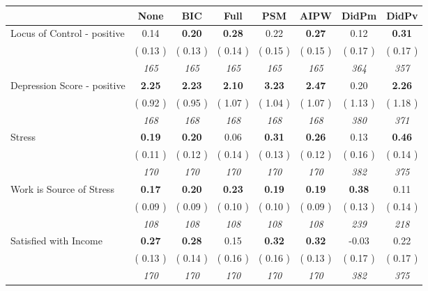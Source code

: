 \begin{tabular}{l c c c c c c c}
\toprule
 & None & BIC & Full & PSM & AIPW & DidPm & DidPv \\
\midrule
Locus of Control - positive &      0.14 & \textbf{      0.20 } & \textbf{      0.28 } &      0.22 & \textbf{     0.27} &      0.12 & \textbf{      0.31 } \\
& (     0.13 ) & (     0.13 ) & (     0.14 ) & (     0.15 ) & (     0.15 ) & (     0.17 ) & (     0.17 ) \\
& \textit{ 165 } & \textit{ 165 } & \textit{ 165 } & \textit{ 165 } & \textit{ 165 } & \textit{ 364 } & \textit{ 357 } \\
Depression Score - positive & \textbf{      2.25 } & \textbf{      2.23 } & \textbf{      2.10 } & \textbf{     3.23} & \textbf{     2.47} &      0.20 & \textbf{      2.26 } \\
& (     0.92 ) & (     0.95 ) & (     1.07 ) & (     1.04 ) & (     1.07 ) & (     1.13 ) & (     1.18 ) \\
& \textit{ 168 } & \textit{ 168 } & \textit{ 168 } & \textit{ 168 } & \textit{ 168 } & \textit{ 380 } & \textit{ 371 } \\
Stress & \textbf{      0.19 } & \textbf{      0.20 } &      0.06 & \textbf{     0.31} & \textbf{     0.26} &      0.13 & \textbf{      0.46 } \\
& (     0.11 ) & (     0.12 ) & (     0.14 ) & (     0.13 ) & (     0.12 ) & (     0.16 ) & (     0.14 ) \\
& \textit{ 170 } & \textit{ 170 } & \textit{ 170 } & \textit{ 170 } & \textit{ 170 } & \textit{ 382 } & \textit{ 375 } \\
Work is Source of Stress & \textbf{      0.17 } & \textbf{      0.20 } & \textbf{      0.23 } & \textbf{     0.19} & \textbf{     0.19} & \textbf{      0.38 } &      0.11 \\
& (     0.09 ) & (     0.09 ) & (     0.10 ) & (     0.10 ) & (     0.09 ) & (     0.13 ) & (     0.14 ) \\
& \textit{ 108 } & \textit{ 108 } & \textit{ 108 } & \textit{ 108 } & \textit{ 108 } & \textit{ 239 } & \textit{ 218 } \\
Satisfied with Income & \textbf{      0.27 } & \textbf{      0.28 } &      0.15 & \textbf{     0.32} & \textbf{     0.32} &     -0.03 &      0.22 \\
& (     0.13 ) & (     0.14 ) & (     0.16 ) & (     0.16 ) & (     0.13 ) & (     0.17 ) & (     0.17 ) \\
& \textit{ 170 } & \textit{ 170 } & \textit{ 170 } & \textit{ 170 } & \textit{ 170 } & \textit{ 382 } & \textit{ 375 } \\

\end{tabular}
